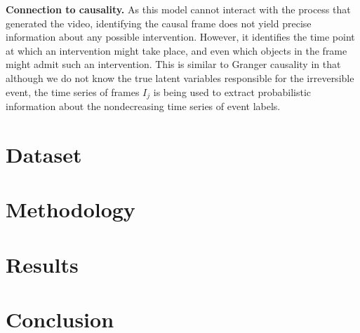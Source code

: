 \documentclass[letterpaper]{article} %
\begin{document}
\noindent \textbf{Connection to causality.} As this model cannot interact with the process that generated the video, identifying the causal frame does not yield precise information about any possible intervention. However, it identifies the time point at which an intervention might take place, and even which objects in the frame might admit such an intervention. This is similar to Granger causality in that although we do not know the true latent variables responsible for the irreversible event,  the time series of frames $I_j$ is being used to extract probabilistic information about the nondecreasing time series of event labels.


\section{Dataset}


\section{Methodology}


\section{Results}


\section{Conclusion}























\end{document}
